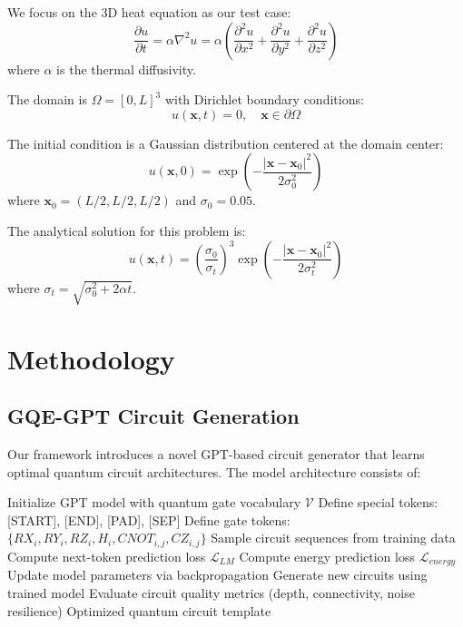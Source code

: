 \documentclass[11pt,a4paper,uplatex,dvipdfmx]{jsarticle}
\begin{document}
We focus on the 3D heat equation as our test case:
\begin{equation}
    \frac{\partial u}{\partial t} = \alpha \nabla^2 u = \alpha \left( \frac{\partial^2 u}{\partial x^2} + \frac{\partial^2 u}{\partial y^2} + \frac{\partial^2 u}{\partial z^2} \right)
\end{equation}
where $\alpha$ is the thermal diffusivity.

The domain is $\Omega = [0, L]^3$ with Dirichlet boundary conditions:
\begin{equation}
    u(\mathbf{x}, t) = 0, \quad \mathbf{x} \in \partial\Omega
\end{equation}

The initial condition is a Gaussian distribution centered at the domain center:
\begin{equation}
    u(\mathbf{x}, 0) = \exp\left(-\frac{|\mathbf{x} - \mathbf{x}_0|^2}{2\sigma_0^2}\right)
\end{equation}
where $\mathbf{x}_0 = (L/2, L/2, L/2)$ and $\sigma_0 = 0.05$.

The analytical solution for this problem is:
\begin{equation}
    u(\mathbf{x}, t) = \left(\frac{\sigma_0}{\sigma_t}\right)^3 \exp\left(-\frac{|\mathbf{x} - \mathbf{x}_0|^2}{2\sigma_t^2}\right)
\end{equation}
where $\sigma_t = \sqrt{\sigma_0^2 + 2\alpha t}$.

\section{Methodology}

\subsection{GQE-GPT Circuit Generation}

Our framework introduces a novel GPT-based circuit generator that learns optimal quantum circuit architectures. The model architecture consists of:

\begin{algorithm}
\caption{GPT-based Quantum Circuit Generation}
\begin{algorithmic}[1]
\STATE Initialize GPT model with quantum gate vocabulary $\mathcal{V}$
\STATE Define special tokens: [START], [END], [PAD], [SEP]
\STATE Define gate tokens: $\{RX_i, RY_i, RZ_i, H_i, CNOT_{i,j}, CZ_{i,j}\}$
    \STATE Sample circuit sequences from training data
    \STATE Compute next-token prediction loss $\mathcal{L}_{LM}$
    \STATE Compute energy prediction loss $\mathcal{L}_{energy}$
    \STATE Update model parameters via backpropagation
\ENDFOR
\STATE Generate new circuits using trained model
\STATE Evaluate circuit quality metrics (depth, connectivity, noise resilience)
\RETURN Optimized quantum circuit template
\end{algorithmic}
\end{algorithm}
\end{document}
